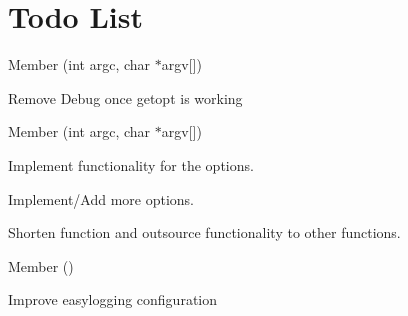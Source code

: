 \chapter{Todo List}
\hypertarget{todo}{}\label{todo}

\begin{DoxyRefList}
\item[Member \doxylink{main_8cpp_a2b2d4ce8b34d14b9e775eaf6214b00e1}{main} (int argc, char \texorpdfstring{$\ast$}{*}argv\mbox{[}\mbox{]})]\label{todo__todo000003}%
%

\begin{DoxyItemize}
\item Remove Debug once getopt is working 
\end{DoxyItemize}
\item[Member \doxylink{classutils_1_1StartupHandler_a9cdd57841cee245c1a1c94b0efe6549c}{utils\+::Startup\+Handler\+::get\+Options} (int argc, char \texorpdfstring{$\ast$}{*}argv\mbox{[}\mbox{]})]\label{todo__todo000002}%
%

\begin{DoxyItemize}
\item Implement functionality for the options.
\item Implement/\+Add more options.
\item Shorten function and outsource functionality to other functions. 
\end{DoxyItemize}
\item[Member \doxylink{classutils_1_1StartupHandler_ade70b280d4385f270829b177da44b169}{utils\+::Startup\+Handler\+::init\+Easy\+Logging} ()]\label{todo__todo000001}%
%

\begin{DoxyItemize}
\item Improve easylogging configuration 
\end{DoxyItemize}
\end{DoxyRefList}